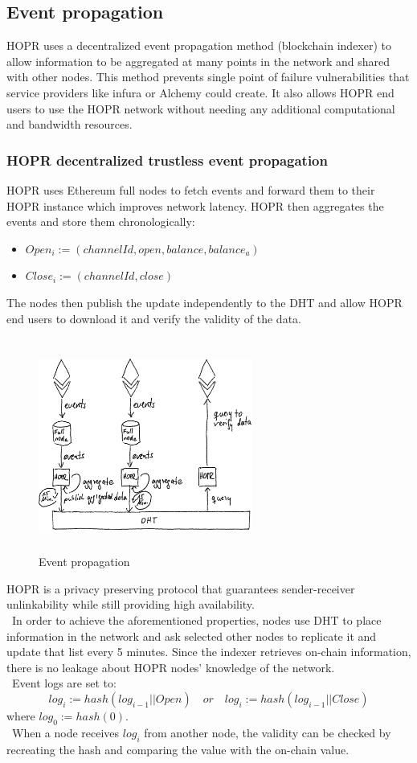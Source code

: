 \subsection{Event propagation}
HOPR uses a decentralized event propagation method (blockchain indexer) to allow information to be aggregated at many points in the network and shared with other nodes. 
This method prevents single point of failure vulnerabilities that service providers like infura or Alchemy could create. 
It also allows HOPR end users to use the HOPR network without needing any additional computational and bandwidth resources.  
\subsubsection*{HOPR decentralized trustless event propagation} 
HOPR uses Ethereum full nodes to fetch events and forward them to their HOPR instance which improves network latency.
HOPR then aggregates the events and store them chronologically:
\begin{itemize}
    \item $Open_i:=(channelId, open, balance, balance_a)$
    \item $Close_i:=(channelId, close)$
\end{itemize}
The nodes then publish the update independently to the DHT and allow HOPR end users to download it and verify the validity of the data.
\begin{figure}[H]
    \centering
    \includegraphics[width=7cm,height=7cm,keepaspectratio]{../whitepaper/images/event_propagation.png}
    \caption{Event propagation}
    \label{fig:Event propagation}
\end{figure}
\hspace{-5mm}HOPR is a privacy preserving protocol that guarantees sender-receiver unlinkability while still providing high availability.
\\~In order to achieve the aforementioned properties, nodes use DHT to place information in the network and ask selected other nodes to replicate it and update that list every 5 minutes. Since the indexer retrieves on-chain information, there is no leakage about HOPR nodes' knowledge of the network. 
\\~Event logs are set to: $$log_i:=hash( log_{i-1}|| Open) \quad or \quad log_i:=hash( log_{i-1}|| Close )$$ where $log_0:=hash(0)$.
\\~When a node receives $log_i$ from another node, the validity can be checked by recreating the hash and comparing the value with the on-chain value.






